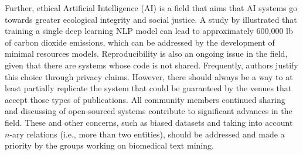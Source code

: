 Further, ethical Artificial Intelligence (AI) is a field that aims that AI systems go towards greater ecological integrity and social justice. A study by \cite{strubell2019energy} illustrated that training a single deep learning NLP model can lead to approximately 600,000 lb of carbon
dioxide emissions, which can be addressed by the development of minimal resources models. Reproducibility is also an ongoing issue in the field, given that there are systems whose code is not shared. Frequently, authors justify this choice through privacy claims. However, there should always be a way to at least partially replicate the system that could be guaranteed by the venues that accept those types of publications. All community members continued sharing and discussing of open-sourced systems contribute to significant advances in the field. These and other concerns, such as biased datasets and taking into account $n$-ary relations (i.e., more than two entities), should be addressed and made a priority by the groups working on biomedical text mining.